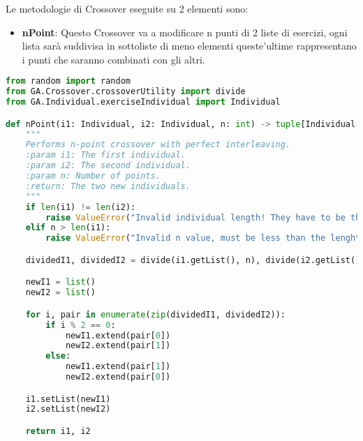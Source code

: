 \documentclass{article}
\begin{document}
Le metodologie di Crossover eseguite su 2 elementi sono:
\begin{itemize}
\item\textbf{nPoint}: Questo Crossover va a modificare n punti di 2 liste di esercizi, ogni lista sarà suddivisa in sottoliste di meno elementi queste'ultime rappresentano i punti che saranno combinati con gli altri.
\end{itemize}
\begin{lstlisting}[language=Python, breaklines, no caption]
from random import random
from GA.Crossover.crossoverUtility import divide
from GA.Individual.exerciseIndividual import Individual

def nPoint(i1: Individual, i2: Individual, n: int) -> tuple[Individual, Individual]:
    """
    Performs n-point crossover with perfect interleaving.
    :param i1: The first individual.
    :param i2: The second individual.
    :param n: Number of points.
    :return: The two new individuals.
    """
    if len(i1) != len(i2):
        raise ValueError("Invalid individual length! They have to be the same.")
    elif n > len(i1):
        raise ValueError("Invalid n value, must be less than the lenght of the individual!")

    dividedI1, dividedI2 = divide(i1.getList(), n), divide(i2.getList(), n)

    newI1 = list()
    newI2 = list()

    for i, pair in enumerate(zip(dividedI1, dividedI2)):
        if i % 2 == 0:
            newI1.extend(pair[0])
            newI2.extend(pair[1])
        else:
            newI1.extend(pair[1])
            newI2.extend(pair[0])

    i1.setList(newI1)
    i2.setList(newI2)

    return i1, i2
        \end{lstlisting}
\end{document}
